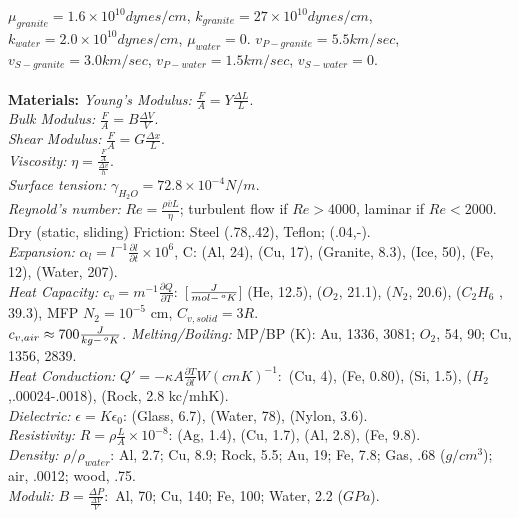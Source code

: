 $\mu_{granite}= 1.6 \times 10^{10} dynes/cm$,
$k_{granite}= 27 \times 10^{10} dynes/cm$,
$k_{water}= 2.0 \times 10^{10} dynes/cm$,
$\mu_{water}= 0$.
$v_{P-granite}= 5.5 km/sec$,
$v_{S-granite}= 3.0 km/sec$,
$v_{P-water}= 1.5 km/sec$,
$v_{S-water}= 0$.
\\
\\
{\bf Materials: }
\emph{Young's Modulus:} ${\frac F A} = Y {\frac {\Delta L} {L}}$.\\
\emph{Bulk Modulus:} ${\frac F A} = B {\frac {\Delta V} {V}}$.\\
\emph{Shear Modulus:} ${\frac F A} = G {\frac {\Delta x} {L}}$.\\
\emph{Viscosity:} $\eta = {\frac {\frac F A}  {\frac {\Delta v} {h}}}$.\\
\emph{Surface tension:} $\gamma_{H_2O}= 72.8 \times 10^{-4} N/m$.\\
\emph{Reynold's number:} $Re = {\frac {\rho {\overline v} L} {\eta}}$;
turbulent flow if $Re>4000$, laminar if $Re<2000$.\\
Dry (static, sliding) Friction:  Steel (.78,.42), Teflon; (.04,-).\\
\emph{Expansion:}
$\alpha_{l} = l^{-1} {\frac {\partial l} {\partial t}} \times 10^{6}$,
C: (Al, 24), (Cu, 17), (Granite, 8.3), (Ice, 50), (Fe, 12), (Water, 207).\\
\emph{Heat Capacity:}
$c_{v} =  m^{-1} {\frac {\partial Q } {\partial T}}:$ [${\frac {J}{mol-\thinspace^oK}}$]
(He, 12.5), ($O_{2}$, 21.1), ($N_{2}$, 20.6),
($C_{2}H_{6}$ , 39.3), MFP $N_{2}= 10^{-5}$ cm,
$C_{v,solid} = 3 R$.\\
$c_{v,air} \approx 700 {\frac {J} {kg-\thinspace^oK}}$.
\emph{Melting/Boiling:}
MP/BP (K): Au, 1336, 3081; $O_{2}$, 54, 90; Cu, 1356, 2839.\\
\emph{Heat Conduction:}
$Q' = - \kappa A  {\frac {\partial T} {\partial l}} W{(cmK)^{-1}}: $
(Cu, 4), (Fe, 0.80), (Si, 1.5), ($H_{2}$,.00024-.0018),
(Rock, 2.8 kc/mhK).\\
\emph{Dielectric:}
$\epsilon = K \epsilon_{0}$: (Glass, 6.7), (Water, 78), (Nylon, 3.6).
\\
\emph{Resistivity:}
$R= \rho {\frac {L}{A}}  \times 10^{-8}$: (Ag, 1.4), (Cu, 1.7), (Al, 2.8),
(Fe, 9.8).
\\
\emph{Density:}
$\rho / \rho_{water}$: Al, 2.7; Cu, 8.9; Rock, 5.5; Au, 19; Fe, 7.8; Gas, .68 ($g/cm^3$);
air, .0012; wood, .75.  \\
\emph{Moduli:}
$B= {\frac {\Delta P} {\frac {\Delta V} {V}}}:$ Al, 70;
Cu, 140; Fe, 100; Water, 2.2 ($GPa$).  \\
